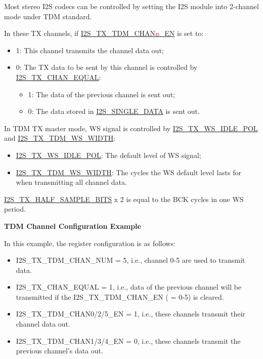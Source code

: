 \documentclass[main\_\_EN.tex]{subfiles}
\begin{document}
\vspace{-1em}
\begin{tiplisting}
Most stereo I2S codecs can be controlled by setting the I2S module into 2-channel mode under TDM standard.
\end{tiplisting}

In these TX channels, if \hyperref[fielddesc:I2STXTDMCHAN0EN]{I2S\_TX\_TDM\_CHAN{\textcolor{red}{n}}\_EN} is set to:

\begin{itemize}
    \item 1: This channel transmits the channel data out;
    \item 0: The TX data to be sent by this channel is controlled by \hyperref[fielddesc:I2STXCHANEQUAL]{I2S\_TX\_CHAN\_EQUAL}:
    \begin{itemize}
        \item 1: The data of the previous channel is sent out;
        \item 0: The data stored in \hyperref[fielddesc:I2SSINGLEDATA]{I2S\_SINGLE\_DATA} is sent out.
    \end{itemize}
\end{itemize}

In TDM TX master mode, WS signal is controlled by \hyperref[fielddesc:I2STXWSIDLEPOL]{I2S\_TX\_WS\_IDLE\_POL} and \hyperref[fielddesc:I2STXTDMWSWIDTH]{I2S\_TX\_TDM\_WS\_WIDTH}:
\begin{itemize}
    \item \hyperref[fielddesc:I2STXWSIDLEPOL]{I2S\_TX\_WS\_IDLE\_POL}: The default level of WS signal;
    \item \hyperref[fielddesc:I2STXTDMWSWIDTH]{I2S\_TX\_TDM\_WS\_WIDTH}: The cycles the WS default level lasts for when transmitting all channel data.
\end{itemize}

\hyperref[fielddesc:I2STXHALFSAMPLEBITS]{I2S\_TX\_HALF\_SAMPLE\_BITS} x 2 is equal to the BCK cycles in one WS period.

\textbf{TDM Channel Configuration Example}

In this example, the register configuration is as follows:
\begin{itemize}
    \item I2S\_TX\_TDM\_CHAN\_NUM = 5, i.e., channel 0-5 are used to transmit data.
    \item I2S\_TX\_CHAN\_EQUAL = 1, i.e., data of the previous channel will be transmitted if the I2S\_TX\_TDM\_CHAN\_EN ( = 0-5) is cleared.
    \item I2S\_TX\_TDM\_CHAN0/2/5\_EN = 1, i.e., these channels transmit their channel data out.
    \item I2S\_TX\_TDM\_CHAN1/3/4\_EN = 0, i.e., these channels transmit the previous channel's data out.
\end{itemize}
\end{document}
